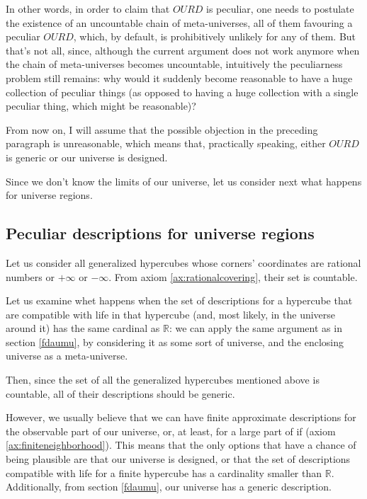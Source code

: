 \documentclass[a4paper
,draft
]{article}
\def\reale{\mathbb{R}}
\begin{document}
In other words, in order to claim that $OURD$ is peculiar,
one needs to postulate the
existence of an uncountable chain of meta-universes, all of them favouring a
peculiar $OURD$, which, by default, is prohibitively unlikely for any of them.
But that's not all, since, although the
current argument does not work anymore when the chain of
meta-universes becomes uncountable, intuitively the peculiarness problem
still remains: why would it suddenly become reasonable to have a huge collection
of peculiar things (as opposed to having a huge collection with a single
peculiar thing, which might be reasonable)?

From now on, I will assume that the possible objection in the preceding
paragraph is unreasonable, which means that, practically speaking,
either $OURD$ is generic or our universe is designed.

Since we don't know the limits of our universe, let us consider next
what happens for universe regions.

\subsection{Peculiar descriptions for universe regions}
\label{sec:peculiarregions}

Let us consider all generalized hypercubes whose corners' coordinates are
rational numbers or $+\infty$ or $-\infty$. From axiom
\ref{ax:rationalcovering}, their set is countable.

Let us examine whet happens when the set of descriptions for a hypercube that
are compatible with life in that hypercube (and, most likely, in the universe
around it) has the same cardinal as $\reale$: we can apply the same argument
as in section \ref{fdaumu}, by considering it as some sort of universe, and the
enclosing universe as a meta-universe.

Then, since the set of all the generalized hypercubes mentioned above is
countable, all of their descriptions should be generic.

However, we usually believe that we can have finite approximate descriptions
for the observable part of our universe, or, at least, for a large part of if
(axiom \ref{ax:finiteneighborhood}).
This means that the only options
that have a chance of being plausible are that our universe is designed, or
that the set of descriptions compatible with life for a finite hypercube
has a cardinality smaller than $\reale$.
Additionally, from section \ref{fdaumu}, our universe has a generic description.
\end{document}
